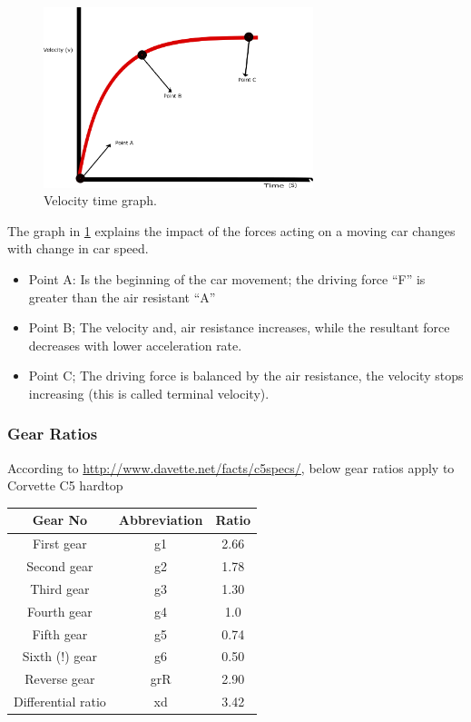 \documentclass{book}
\begin{document}
\begin{figure}
    \centering
    \includegraphics[width=0.7\textwidth]{text3864}
    \caption{Velocity time graph.}
    \label{fig:Velocitytimegraph}
\end{figure}

The graph in \ref{fig:Velocitytimegraph}  explains the impact of the forces acting on a moving car changes with change in car speed.\\
\begin{itemize}
    \item Point A:  Is the beginning of the car movement; the driving force “F” is greater than the air resistant “A”\\
    \item Point B; The velocity and, air resistance increases, while the resultant force decreases with lower acceleration rate.\\
    \item Point C; The driving force is balanced by the air resistance, the velocity stops increasing (this is called terminal velocity).
\end{itemize}

\newcommand{\esymbol}[1]{\textbf{\textit{#1}}}

\subsubsection{Gear Ratios}
According to {\url{http://www.davette.net/facts/c5specs/}}, below gear ratios apply to Corvette C5 hardtop

\begin{center}
\begin{tabular}{ |c|c|c| }
 \hline
 Gear No & Abbreviation  & Ratio \\
  \hline
 First gear &  g1  & 2.66 \\
  \hline
  Second gear &  g2  & 1.78 \\
  \hline
   Third gear &  g3  & 1.30 \\
  \hline
   Fourth gear &  g4  & 1.0 \\
  \hline
    Fifth gear &  g5  & 0.74 \\
  \hline
  Sixth (!) gear &  g6  & 0.50 \\
  \hline
  Reverse gear &  grR & 2.90 \\
  \hline
  Differential ratio & xd & 3.42\\
  \hline
\end{tabular}
\end{center}
\end{document}
